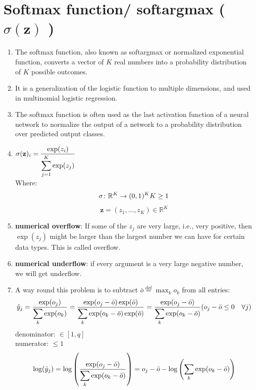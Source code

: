 \section{Softmax function/ softargmax ( $\sigma (\mathbf {z})$ ) \cite{wiki-softmax-function,dnn-1}} \label{Softmax function}
\begin{enumerate}
    \item The softmax function, also known as softargmax or normalized exponential function, converts a vector of $K$ real numbers into a probability distribution of $K$ possible outcomes. 
    
    \item It is a generalization of the logistic function to multiple dimensions, and used in multinomial logistic regression. 
    
    \item The softmax function is often used as the last activation function of a neural network to normalize the output of a network to a probability distribution over predicted output classes.

    \item $
        {\displaystyle \sigma (\mathbf {z} )_{i}={\displaystyle\dfrac {\exp({z_{i}})}{\displaystyle\sum _{j=1}^{K} \exp({z_{j}})}}}
    $\\
    Where:
    \[
        {\displaystyle \sigma \colon \mathbb {R} ^{K}\to (0,1)^{K}}
        \hfill
        {\displaystyle K\geq 1}
    \]
    \[
        {\displaystyle \mathbf {z} =(z_{1},\dotsc ,z_{K})\in \mathbb {R} ^{K}}
    \]

    \item \textbf{numerical overflow}: If some of the $z_j$ are very large, i.e., very positive, then $\exp(z_j)$ might be larger than the largest number we can have for certain data types. This is called overflow.
    
    \item \textbf{numerical underflow}: if every argument is a very large negative number, we will get underflow.
    
    \item A way round this problem is to subtract $\bar{o} \stackrel{\textrm{def}}{=} \max_k o_k$ from all entries:
    \[
        \hfill
        \hat y_j 
        = \dfrac{\exp (o_j)}{\dsum_k \exp (o_k)} 
        = \dfrac{\exp(o_j - \bar{o}) \exp (\bar{o})}{\dsum_k \exp (o_k - \bar{o}) \exp (\bar{o})} 
        = \dfrac{\exp(o_j - \bar{o})}{\dsum_k \exp (o_k - \bar{o})}
        \hfill
        (o_j - \bar{o} \leq 0 \quad \forall j)
    \]
    denominator: $\in [1, q]$\\
    numerator: $\leq 1$ \\
    \[
        \hfill
        \log (\hat{y}_j )
        = \log \dParenBrac{\dfrac{\exp(o_j - \bar{o})}{\dsum_k \exp (o_k - \bar{o})} }
        = o_j - \bar{o} - \log \dParenBrac{\dsum_k \exp (o_k - \bar{o})}
        \hfill
    \]
    
\end{enumerate}
